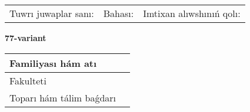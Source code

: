 \documentclass{article}
\begin{document}
\begin{tabular}{lll}
Tuwrı juwaplar sanı: \underline{\hspace{1.5cm}} & 
Bahası: \underline{\hspace{1.5cm}} & 
Imtixan alıwshınıń qolı: \underline{\hspace{2cm}} \\
\end{tabular}

\egroup

\newpage


\textbf{77-variant}\\

\bgroup
\def\arraystretch{1.6} %

\begin{tabular}{|m{5.7cm}|m{9.5cm}|}
\hline
Familiyası hám atı & \\
\hline
Fakulteti  & \\
\hline
Toparı hám tálim baǵdarı  & \\
\hline
\end{tabular}

\vspace{1cm}
\end{document}
